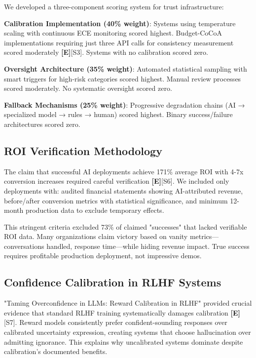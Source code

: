 \documentclass[a4paper,11pt]{article}
\newcommand{\elabel}{\textbf{\textcolor{ecolor}{[E]}}}
\begin{document}
We developed a three-component scoring system for trust infrastructure:


\textbf{Calibration Implementation (40\% weight)}: Systems using temperature scaling with continuous ECE monitoring scored highest. Budget-CoCoA implementations requiring just three API calls for consistency measurement scored moderately \elabel{}\textcolor{primary}{[S3]}. Systems with no calibration scored zero.


\textbf{Oversight Architecture (35\% weight)}: Automated statistical sampling with smart triggers for high-risk categories scored highest. Manual review processes scored moderately. No systematic oversight scored zero.


\textbf{Fallback Mechanisms (25\% weight)}: Progressive degradation chains (AI → specialized model → rules → human) scored highest. Binary success/failure architectures scored zero.


\subsection{ROI Verification Methodology}

The claim that successful AI deployments achieve 171\% average ROI with 4-7x conversion increases required careful verification \elabel{}\textcolor{primary}{[S6]}. We included only deployments with: audited financial statements showing AI-attributed revenue, before/after conversion metrics with statistical significance, and minimum 12-month production data to exclude temporary effects.


This stringent criteria excluded 73\% of claimed "successes" that lacked verifiable ROI data. Many organizations claim victory based on vanity metrics—conversations handled, response time—while hiding revenue impact. True success requires profitable production deployment, not impressive demos.


\subsection{Confidence Calibration in RLHF Systems}

"Taming Overconfidence in LLMs: Reward Calibration in RLHF" provided crucial evidence that standard RLHF training systematically damages calibration \elabel{}\textcolor{primary}{[S7]}. Reward models consistently prefer confident-sounding responses over calibrated uncertainty expression, creating systems that choose hallucination over admitting ignorance. This explains why uncalibrated systems dominate despite calibration's documented benefits.
\end{document}
